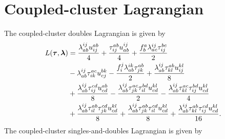     \section{Coupled-cluster Lagrangian}
        \label{app:cc-lagrangian}
        The coupled-cluster doubles Lagrangian is given by
        \begin{align}
            L(\boldsymbol{\tau}, \boldsymbol{\lambda})
            &=
            \frac{\lambda^{ij}_{ab} u^{ab}_{ij}}{4}
            + \frac{\tau^{ab}_{ij} u^{ij}_{ab}}{4}
            + \frac{f^{a}_{b} \lambda^{ij}_{ac} \tau^{bc}_{ij}}{2}
            \nonumber \\
            \qquad &
            - \lambda^{ij}_{ab} \tau^{ac}_{ik} u^{bk}_{cj}
            - \frac{f^{j}_{i} \lambda^{ik}_{ab} \tau^{ab}_{jk}}{2}
            + \frac{\lambda^{ij}_{ab} \tau^{ab}_{kl} u^{kl}_{ij}}{8}
            \nonumber \\
            \qquad &
            + \frac{\lambda^{ij}_{ab} \tau^{cd}_{ij} u^{ab}_{cd}}{8}
            - \frac{\lambda^{ij}_{ab} \tau^{ac}_{jk} \tau^{bd}_{il} u^{kl}_{cd}}{2}
            - \frac{\lambda^{ij}_{ab} \tau^{ac}_{kl} \tau^{bd}_{ij} u^{kl}_{cd}}{4}
            \nonumber \\
            \qquad &
            + \frac{\lambda^{ij}_{ab} \tau^{ab}_{il} \tau^{cd}_{jk} u^{kl}_{cd}}{8}
            + \frac{\lambda^{ij}_{ab} \tau^{ab}_{jk} \tau^{cd}_{il} u^{kl}_{cd}}{8}
            + \frac{\lambda^{ij}_{ab} \tau^{ab}_{kl} \tau^{cd}_{ij} u^{kl}_{cd}}{16}.
        \end{align}
        The coupled-cluster singles-and-doubles Lagrangian is given by
